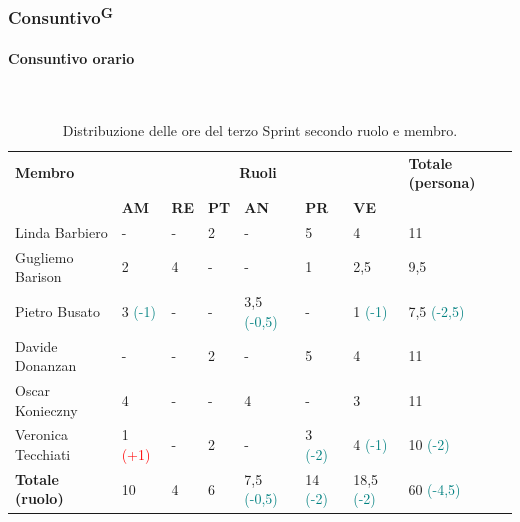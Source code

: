 \documentclass[8pt]{article}
\newcommand{\glossterm}[1]{#1\textsuperscript{G}} %
\newcommand{\subsubsubsection}[1]{\paragraph{#1}\mbox{}\\}
\begin{document}
\subsubsection{\glossterm{Consuntivo}}
\subsubsubsection{Consuntivo orario}
\begin{table}[ht!]
	\centering
	\begin{tabular}{p{4cm}*{6}{l}p{3cm}}
        \toprule
		\textbf{Membro} & \multicolumn{6}{c}{\textbf{Ruoli}} & \textbf{Totale
        (persona)}\\
		& \textbf{AM} & \textbf{RE} & \textbf{PT} & \textbf{AN} & \textbf{PR} & \textbf{VE}\\
		\midrule
        Linda Barbiero & - & - & 2 & - & 5 & 4 & 11 \\ 
        Gugliemo Barison & 2 & 4 & - & - & 1 & 2,5 & 9,5 \\ 
        Pietro Busato & 3 \textcolor{teal}{(-1)}& - & - & 3,5 \textcolor{teal}{(-0,5)}& - & 1 \textcolor{teal}{(-1)}& 7,5 \textcolor{teal}{(-2,5)} \\ 
        Davide Donanzan & - & - & 2 & - & 5 & 4 & 11 \\ 
        Oscar Konieczny & 4 & - & - & 4 & - & 3 & 11 \\ 
        Veronica Tecchiati & 1 \textcolor{red}{(+1)}& - & 2 & - & 3 \textcolor{teal}{(-2)}& 4 \textcolor{teal}{(-1)}& 10 \textcolor{teal}{(-2)}\\ 
        \midrule
        \textbf{Totale (ruolo)} & 10 & 4 & 6 & 7,5 \textcolor{teal}{(-0,5)}& 14 \textcolor{teal}{(-2)}& 18,5 \textcolor{teal}{(-2)}& 60 \textcolor{teal}{(-4,5)} \\ 
        \bottomrule
    \end{tabular}
	\caption{Distribuzione delle ore del terzo Sprint secondo ruolo e membro.}
	\label{table:Distribuzione delle ore del terzo Sprint secondo ruolo e membr}
\end{table}
\end{document}
